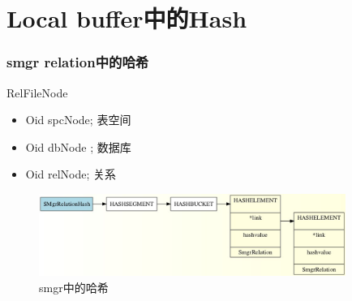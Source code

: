 \documentclass{beamer}
\begin{document}
\begin{CJK*}{UTF8}{gkai}
\begin{frame}
\end{frame}



\section{Local buffer中的Hash} 

\begin{frame}
\transdissolve
\frametitle{smgr relation中的哈希}
\begin{exampleblock}{RelFileNode}
\tiny
\begin{itemize}
\item \quad Oid spcNode; 表空间
\item \quad Oid dbNode ; 数据库
\item \quad Oid relNode; 关系
\end{itemize}
\end{exampleblock}
\begin{figure}[!ht]
\centering
\includegraphics[width = 100mm]{smgr.jpg}
\caption{smgr中的哈希}
\label{overflow}
\end{figure}
\end{frame}


\end{CJK*}
\end{document}
